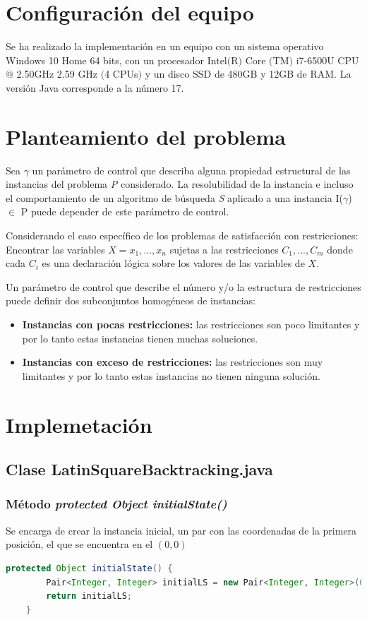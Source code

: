 \documentclass[11pt,letterpaper]{article}
\begin{document}
\section{Configuración del equipo}
Se ha realizado la implementación en un equipo con un sistema operativo Windows 10 Home 64 bits, con un procesador Intel$($R$)$ Core $($TM$)$ i7-6500U CPU $@$ 2.50GHz 2.59 GHz $($4 CPUs$)$ y un disco SSD de 480GB y 12GB de RAM. La versión Java corresponde a la número 17.

\section{Planteamiento del problema}
Sea $\gamma$ un parámetro de control que describa alguna propiedad estructural de las instancias del problema \textit{P} considerado. La resolubilidad de la instancia e incluso el comportamiento de un algoritmo de búsqueda \textit{S} aplicado a una instancia I($\gamma$) $\in$ P puede depender de este parámetro de control.

Considerando el caso específico de los problemas de satisfacción con restricciones: Encontrar las variables $X = {x_1, ..., x_n}$ sujetas a las restricciones $C_1, ..., C_m$ donde cada $C_i$ es una declaración lógica sobre los valores de las variables de $X$.

Un parámetro de control que describe el número y/o la estructura de restricciones puede definir dos subconjuntos homogéneos de instancias:
\begin{itemize}
	\item \textbf{Instancias con pocas restricciones:} las restricciones son poco limitantes y por lo tanto estas instancias tienen muchas soluciones.
	\item \textbf{Instancias con exceso de restricciones:} las restricciones son muy limitantes y por lo tanto estas instancias no tienen ninguna solución.
\end{itemize}


\section{Implemetación}
\subsection{Clase LatinSquareBacktracking.java}

\subsubsection{Método \textit{protected Object initialState()}}
Se encarga de crear la instancia inicial, un par con las coordenadas de la primera posición, el que se encuentra en el $(0, 0)$
\begin{lstlisting}[language = java]
	protected Object initialState() {
		Pair<Integer, Integer> initialLS = new Pair<Integer, Integer>(0, 0);
		return initialLS;
	}
\end{lstlisting}
\end{document}
